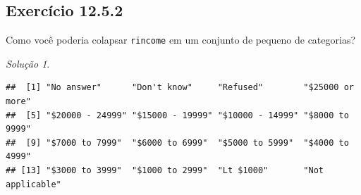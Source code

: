 \documentclass[
]{latex/krantz}
\newenvironment{Shaded}{\begin{snugshade}}{\end{snugshade}}
\newcommand{\FunctionTok}[1]{\textcolor[rgb]{0.13,0.29,0.53}{\textbf{#1}}}
\newcommand{\NormalTok}[1]{#1}
\newcommand{\SpecialCharTok}[1]{\textcolor[rgb]{0.81,0.36,0.00}{\textbf{#1}}}
\theoremstyle{definition}
\theoremstyle{definition}
\theoremstyle{definition}
\theoremstyle{definition}
\theoremstyle{remark}
\newtheorem*{solution}{Solução}
\begin{document}
\hypertarget{exr12-5-2}{%
\subsection*{Exercício 12.5.2}\label{exr12-5-2}}

Como você poderia colapsar \texttt{rincome} em um conjunto de pequeno de categorias?

\begin{solution}
\leavevmode

\begin{Shaded}
\end{Shaded}

\begin{verbatim}
##  [1] "No answer"      "Don't know"     "Refused"        "$25000 or more"
##  [5] "$20000 - 24999" "$15000 - 19999" "$10000 - 14999" "$8000 to 9999" 
##  [9] "$7000 to 7999"  "$6000 to 6999"  "$5000 to 5999"  "$4000 to 4999" 
## [13] "$3000 to 3999"  "$1000 to 2999"  "Lt $1000"       "Not applicable"
\end{verbatim}


\end{solution}
\end{document}
